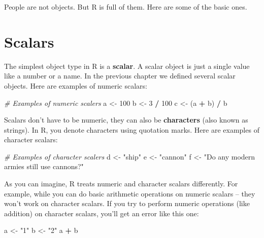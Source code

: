 \documentclass[]{book}
\newenvironment{Shaded}{\begin{snugshade}}{\end{snugshade}}
\newcommand{\DecValTok}[1]{\textcolor[rgb]{0.00,0.00,0.81}{#1}}
\newcommand{\StringTok}[1]{\textcolor[rgb]{0.31,0.60,0.02}{#1}}
\newcommand{\CommentTok}[1]{\textcolor[rgb]{0.56,0.35,0.01}{\textit{#1}}}
\newcommand{\OperatorTok}[1]{\textcolor[rgb]{0.81,0.36,0.00}{\textbf{#1}}}
\newcommand{\NormalTok}[1]{#1}
\theoremstyle{definition}
\theoremstyle{definition}
\theoremstyle{remark}
\begin{document}
People are not objects. But R is full of them. Here are some of the
basic ones.

\section{Scalars}\label{scalars}

The simplest object type in R is a \textbf{scalar}. A scalar object is
just a single value like a number or a name. In the previous chapter we
defined several scalar objects. Here are examples of numeric scalars:

\begin{Shaded}
\begin{Highlighting}[]
\CommentTok{# Examples of numeric scalers}
\NormalTok{a <-}\StringTok{ }\DecValTok{100}
\NormalTok{b <-}\StringTok{ }\DecValTok{3} \OperatorTok{/}\StringTok{ }\DecValTok{100}
\NormalTok{c <-}\StringTok{ }\NormalTok{(a }\OperatorTok{+}\StringTok{ }\NormalTok{b) }\OperatorTok{/}\StringTok{ }\NormalTok{b}
\end{Highlighting}
\end{Shaded}

Scalars don't have to be numeric, they can also be \textbf{characters}
(also known as strings). In R, you denote characters using quotation
marks. Here are examples of character scalars:

\begin{Shaded}
\begin{Highlighting}[]
\CommentTok{# Examples of character scalers}
\NormalTok{d <-}\StringTok{ "ship"}
\NormalTok{e <-}\StringTok{ "cannon"}
\NormalTok{f <-}\StringTok{ "Do any modern armies still use cannons?"}
\end{Highlighting}
\end{Shaded}

As you can imagine, R treats numeric and character scalars differently.
For example, while you can do basic arithmetic operations on numeric
scalars -- they won't work on character scalars. If you try to perform
numeric operations (like addition) on character scalars, you'll get an
error like this one:

\begin{Shaded}
\begin{Highlighting}[]
\NormalTok{a <-}\StringTok{ "1"}
\NormalTok{b <-}\StringTok{ "2"}
\NormalTok{a }\OperatorTok{+}\StringTok{ }\NormalTok{b}
\end{Highlighting}
\end{Shaded}
\end{document}
